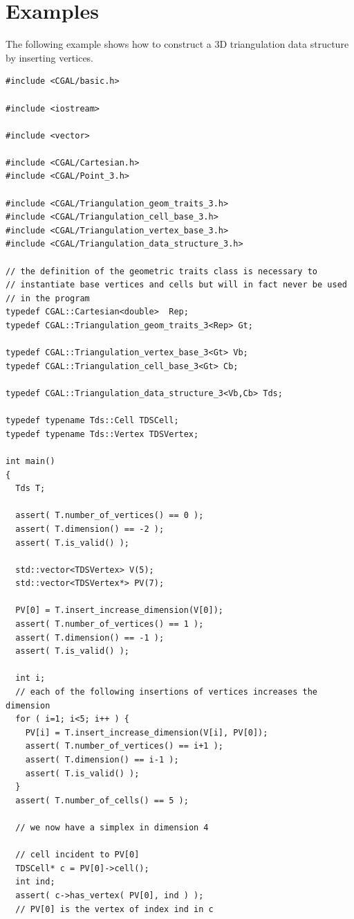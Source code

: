 \section{Examples}
\label{TDS3-sec-examples}
The following example shows how to construct a 3D triangulation data
structure by inserting vertices.
\begin{verbatim}
#include <CGAL/basic.h>

#include <iostream>

#include <vector>

#include <CGAL/Cartesian.h>
#include <CGAL/Point_3.h>

#include <CGAL/Triangulation_geom_traits_3.h>
#include <CGAL/Triangulation_cell_base_3.h>
#include <CGAL/Triangulation_vertex_base_3.h>
#include <CGAL/Triangulation_data_structure_3.h>

// the definition of the geometric traits class is necessary to
// instantiate base vertices and cells but will in fact never be used
// in the program 
typedef CGAL::Cartesian<double>  Rep;
typedef CGAL::Triangulation_geom_traits_3<Rep> Gt;

typedef CGAL::Triangulation_vertex_base_3<Gt> Vb;
typedef CGAL::Triangulation_cell_base_3<Gt> Cb;

typedef CGAL::Triangulation_data_structure_3<Vb,Cb> Tds;

typedef typename Tds::Cell TDSCell;
typedef typename Tds::Vertex TDSVertex;

int main()
{
  Tds T;

  assert( T.number_of_vertices() == 0 );
  assert( T.dimension() == -2 );
  assert( T.is_valid() );

  std::vector<TDSVertex> V(5);
  std::vector<TDSVertex*> PV(7);

  PV[0] = T.insert_increase_dimension(V[0]);
  assert( T.number_of_vertices() == 1 );
  assert( T.dimension() == -1 );
  assert( T.is_valid() );

  int i;
  // each of the following insertions of vertices increases the dimension
  for ( i=1; i<5; i++ ) {
    PV[i] = T.insert_increase_dimension(V[i], PV[0]);
    assert( T.number_of_vertices() == i+1 );
    assert( T.dimension() == i-1 );
    assert( T.is_valid() );
  }
  assert( T.number_of_cells() == 5 );

  // we now have a simplex in dimension 4

  // cell incident to PV[0]
  TDSCell* c = PV[0]->cell();
  int ind;
  assert( c->has_vertex( PV[0], ind ) );
  // PV[0] is the vertex of index ind in c


\end{verbatim}
